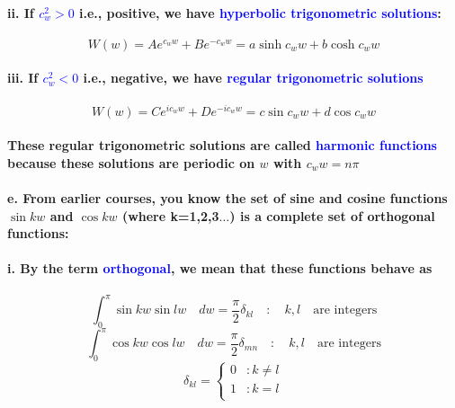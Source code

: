 \documentclass{article}
\begin{document}
\paragraph{\indent ii. If \textcolor{blue}{$c_w^2>0$} i.e., positive, we have \textcolor{blue}{hyperbolic trigonometric solutions}:}
\begin{equation*}
    W(w)=Ae^{c_ww}+Be^{-c_ww}=a\sinh c_w w+b\cosh c_w w
\end{equation*}
\paragraph{\indent iii. If \textcolor{blue}{$c_w^2<0$} i.e., negative, we have \textcolor{blue}{regular trigonometric solutions}}
\begin{equation*}
    W(w)=Ce^{ic_ww}+De^{-ic_ww}=c\sin c_ww+d\cos c_ww
\end{equation*}
\paragraph{These regular trigonometric solutions are called \textcolor{blue}{harmonic functions} because these solutions are periodic on $w$ with $c_ww=n\pi$}
\paragraph{\indent e. From earlier courses, you know the set of sine and cosine functions $\sin kw$ and $\cos kw$ (where k=1,2,3$\dots$) is a complete set of orthogonal functions:}
\paragraph{\indent i. By the term \textcolor{blue}{orthogonal}, we mean that these functions behave as}
\begin{equation*}
    \int_0^{\pi} \sin kw \sin lw \quad dw=\frac{\pi}{2}\delta_{kl}\quad:\quad k,l \quad \text{are integers}
\end{equation*}
\begin{equation*}
    \int_0^{\pi} \cos{kw}\cos{lw}\quad dw=\frac{\pi}{2}\delta_{mn}\quad:\quad k,l \quad \text{are integers}
\end{equation*}
\begin{equation*}
    \delta_{kl}=\begin{cases}
        0 &: k\neq l \\
        1 &: k=l\\
    \end{cases}
\end{equation*}
\end{document}
